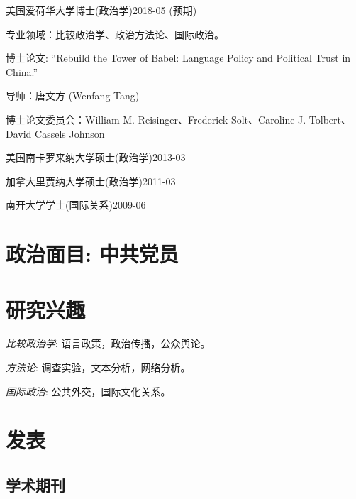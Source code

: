 \documentclass[10.5pt,]{article}
\providecommand{\tightlist}{%
	\setlength{\itemsep}{0pt}\setlength{\parskip}{0pt}}
\renewenvironment{itemize}{
	\begin{list}{}{
			\setlength{\leftmargin}{1.5em}
		}
	}{
	\end{list}
}
\begin{document}
\begin{itemize}
\tightlist
\item
  美国爱荷华大学博士(政治学)\hfill 2018-05 (预期)

  \begin{itemize}
  \tightlist
  \item
    \footnotesize 专业领域：比较政治学、政治方法论、国际政治。
  \item
    \footnotesize 博士论文: ``Rebuild the Tower of Babel: Language
    Policy and Political Trust in China.''

    \begin{itemize}
    \tightlist
    \item
      导师：唐文方 (Wenfang Tang)
    \item
      博士论文委员会：William M. Reisinger、Frederick Solt、Caroline J.
      Tolbert、David Cassels Johnson
    \end{itemize}
  \end{itemize}
\item
  美国南卡罗来纳大学硕士(政治学)\hfill 2013-03
\item
  加拿大里贾纳大学硕士(政治学)\hfill 2011-03
\item
  南开大学学士(国际关系)\hfill 2009-06
\end{itemize}

\section{政治面目: 中共党员}\label{-}

\section{研究兴趣}

\begin{itemize}
\tightlist
\item
  \emph{比较政治学}: 语言政策，政治传播，公众舆论。
\item
  \emph{方法论}: 调查实验，文本分析，网络分析。
\item
  \emph{国际政治}: 公共外交，国际文化关系。
\end{itemize}

\section{发表}

\subsection{学术期刊}
\end{document}
